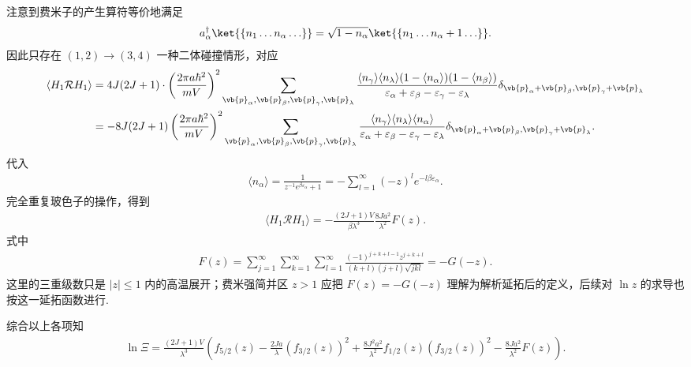 注意到费米子的产生算符等价地满足
\begin{align*}
	a_{\alpha}^{\dagger} \ket{\{n_{1} \ldots n_{\alpha} \ldots\}} = \sqrt{1 - n_{\alpha}} \ket{\{n_{1} \ldots n_{\alpha} + 1 \ldots\}}.
\end{align*}
因此只存在 \((1,2) \to (3,4)\) 一种二体碰撞情形，对应
\begin{align*}
	\langle H_{1} \mathcal{R} H_{1} \rangle &= 4J(2J+1) \cdot \left( \frac{2\pi a \hbar^{2}}{m V} \right)^{2} \sum_{\vb{p}_{\alpha},\vb{p}_{\beta},\vb{p}_{\gamma},\vb{p}_{\lambda}} \frac{\langle n_{\gamma} \rangle \langle n_{\lambda} \rangle (1 - \langle n_{\alpha} \rangle) (1 - \langle n_{\beta} \rangle)}{\varepsilon_{\alpha} + \varepsilon_{\beta} - \varepsilon_{\gamma} - \varepsilon_{\lambda}} \delta_{\vb{p}_{\alpha} + \vb{p}_{\beta}, \vb{p}_{\gamma} + \vb{p}_{\lambda}} \\
	&= -8 J (2J+1) \left( \frac{2\pi a \hbar^{2}}{m V} \right)^{2} \sum_{\vb{p}_{\alpha},\vb{p}_{\beta},\vb{p}_{\gamma},\vb{p}_{\lambda}} \frac{\langle n_{\gamma} \rangle \langle n_{\lambda} \rangle \langle n_{\alpha} \rangle}{\varepsilon_{\alpha} + \varepsilon_{\beta} - \varepsilon_{\gamma} - \varepsilon_{\lambda}} \delta_{\vb{p}_{\alpha} + \vb{p}_{\beta}, \vb{p}_{\gamma} + \vb{p}_{\lambda}}.
\end{align*}
代入
\begin{align*}
	\langle n_{\alpha} \rangle = \frac{1}{z^{-1} e^{\beta \varepsilon_{\alpha}} + 1} = -\sum_{l=1}^{\infty} (-z)^{l} e^{-l\beta \varepsilon_{\alpha}}.
\end{align*}
完全重复玻色子的操作，得到
\begin{align*}
	\langle H_{1} \mathcal{R} H_{1} \rangle = -\frac{(2J+1) V}{\beta \lambda^{3}} \frac{8J a^{2}}{\lambda^{2}} F(z).
\end{align*}
式中
\begin{align*}
	F(z) = \sum_{j=1}^{\infty} \sum_{k=1}^{\infty} \sum_{l=1}^{\infty} \frac{(-1)^{j+k+l-1} z^{j+k+l}}{(k+l)(j+l) \sqrt{jkl}} = -G(-z).
\end{align*}
这里的三重级数只是 \(|z|\le1\) 内的高温展开；费米强简并区 \(z>1\) 应把 \(F(z)=-G(-z)\) 理解为解析延拓后的定义，后续对 \(\ln z\) 的求导也按这一延拓函数进行.

综合以上各项知
\begin{align*}
	\ln \Xi = \frac{(2J+1) V}{\lambda^{3}} \left( f_{5/2}(z) - \frac{2J a}{\lambda} (f_{3/2}(z))^{2} + \frac{8J^{2} a^{2}}{\lambda^{2}} f_{1/2}(z) (f_{3/2}(z))^{2} - \frac{8J a^{2}}{\lambda^{2}} F(z) \right).
\end{align*}

